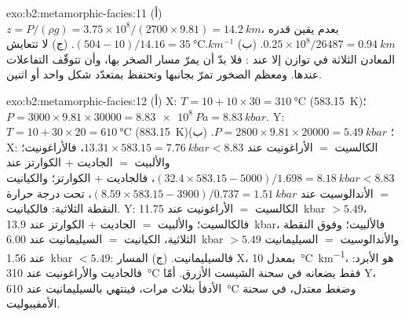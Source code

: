 \begin{solution}{exo:b2:metamorphic-facies:11}
(أ) $z = P/(\rho g) = 3.75\times10^8/(2700\times9.81) = \qty{14.2}{km}$، بعدم يقين قدره
$0.25\times10^8/26487 = \qty{0.94}{km}$. (ب) $(504 - 10)/14.16 =
\qty{35}{\celsius.km^{-1}}$. (ج) لا تتعايش المعادن الثلاثة في توازن إلا عند
: فلا بدّ أن يمرّ مسار الصخر بها، وأن تتوقّف التفاعلات
عندها. ومعظم الصخور تمرّ بجانبها وتحتفظ بمتعدّد شكل واحد أو اثنين.
\end{solution}

\begin{solution}{exo:b2:metamorphic-facies:12}
(أ) X: $T = 10 + 10\times30 = \qty{310}{\celsius}$ (\qty{583.15}{K})؛ $P = 3000\times
9.81\times30000 = \qty{8.83e8}{Pa} = \qty{8.83}{kbar}$. Y: $T = 10 + 30\times20 =
\qty{610}{\celsius}$ (\qty{883.15}{K})؛ $P = 2800\times9.81\times20000 = \qty{5.49}{kbar}$.
(ب) X: الكالسيت $=$ الأراغونيت عند $13.31\times583.15 = \qty{7.76}{kbar} < 8.83$، فالأراغونيت؛
والألبيت $=$ الجاديت + الكوارتز عند $(32.4\times583.15 - 5000)/1.698 = \qty{8.18}{kbar} <
8.83$، فالجاديت + الكوارتز؛ والكيانيت $=$ الأندالوسيت عند $(8.59\times583.15 - 3900)/0.737 =
\qty{1.51}{kbar}$، تحت درجة حرارة النقطة الثلاثية: فالكيانيت. Y: الكالسيت $=$
الأراغونيت عند \qty{11.75}{kbar} $> 5.49$، فالكالسيت؛ والألبيت $=$ الجاديت + الكوارتز عند
\qty{13.9}{kbar}، فالألبيت؛ وفوق النقطة الثلاثية، الكيانيت $=$ السيليمانيت عند
\qty{6.00}{kbar} $> 5.49$ والأندالوسيت $=$ السيليمانيت عند \qty{1.56}{kbar} $< 5.49$:
فالسيليمانيت. (ج) المسار X، بمعدل \qty{10}{\celsius\per\km}، هو الأبرد: فالجاديت
والأراغونيت عند \qty{310}{\celsius} فقط يضعانه في سحنة الشيست الأزرق. أمّا Y، الأدفأ بثلاث
مرات، فينتهي بالسيليمانيت عند \qty{610}{\celsius} وضغط معتدل، في
سحنة الأمفيبوليت.
\end{solution}


